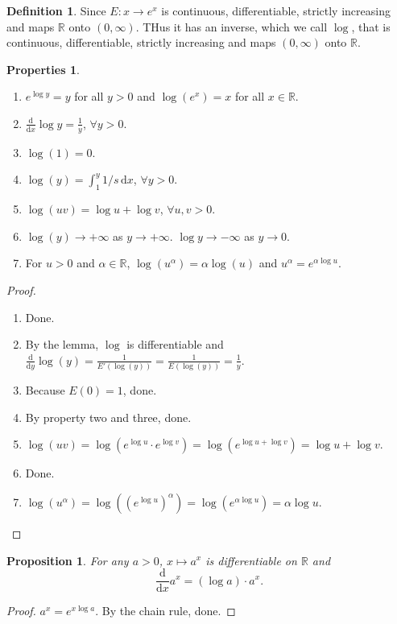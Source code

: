 \documentclass[12pt]{article}
\theoremstyle{plain}
\newtheorem*{prop}{Proposition}
\theoremstyle{definition}
\newtheorem*{defn}{Definition}
\newtheorem*{property}{Properties}
\begin{document}
\begin{defn}
    Since $E:x\rightarrow e^x$ is continuous, differentiable, strictly increasing and maps $\mathbb{R}$ onto
    $(0,\infty)$. THus it has an inverse, which we call $\log$, that is continuous, differentiable, strictly increasing
    and maps $(0,\infty)$ onto $\mathbb{R}$.
\end{defn}
\begin{property}
    \begin{enumerate}
        \item $e^{\log y} = y$ for all $y>0$ and $\log(e^x) = x$ for all $x\in \mathbb{R}$.
        \item $\frac{\mathrm{d}}{\mathrm{d}x}\log y = \frac{1}{y}$, $\forall y>0$.
        \item $\log(1) = 0$.
        \item $\log(y) = \int_1^y 1/s\,\mathrm{d}x$, $\forall y>0$.
        \item $\log(uv) = \log u + \log v$, $\forall u,v>0$.
        \item $\log(y)\rightarrow +\infty$ as $y\rightarrow +\infty$.
            $\log y\rightarrow-\infty$ as $y\rightarrow0$.
        \item For $u>0$ and $\alpha\in\mathbb{R}$, $\log(u^\alpha) = \alpha \log(u)$ and $u^\alpha = e^{\alpha\log u}$.
    \end{enumerate}
\end{property}
\begin{proof}
    \begin{enumerate}
        \item Done.
        \item By the lemma, $\log$ is differentiable and $\frac{\mathrm{d}}{\mathrm{d}y} \log(y) = \frac{1}{E'(\log
            (y))} = \frac{1}{E(\log(y))}=\frac{1}{y}$.
        \item Because $E(0) = 1$, done.
        \item By property two and three, done.
        \item $\log(uv) = \log(e^{\log u} \cdot e^{\log v}) = \log(e^{\log u+\log v}) = \log u + \log v$.
        \item Done.
        \item $\log(u^\alpha) = \log((e^{\log u})^\alpha) = \log(e^{\alpha \log u}) = \alpha \log u$.
    \end{enumerate}
\end{proof}

\begin{prop}
    For any $a>0$, $x\mapsto a^x$ is differentiable on $\mathbb{R}$ and
    \[\frac{\mathrm{d}}{\mathrm{d}x} a^x = (\log a)\cdot a^x.\]
\end{prop}
\begin{proof}
    $a^x = e^{x\log a}$. By the chain rule, done.
\end{proof}
\end{document}
